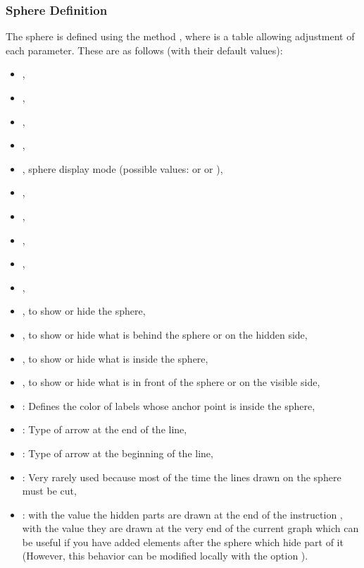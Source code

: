 \subsubsection{Sphere Definition}

The sphere is defined using the method , where  is a table allowing adjustment of each parameter. These are as follows (with their default values):
\begin{itemize}
    \item {},
    \item {},
    \item {},
    \item {},
    \item {}, sphere display mode (possible values:  or  or ),
    \item {},
    \item {},
    \item {},
    \item {},
    \item {},
    \item {}, to show or hide the sphere,
    \item {}, to show or hide what is behind the sphere or on the hidden side,
    \item {}, to show or hide what is inside the sphere,
    \item {}, to show or hide what is in front of the sphere or on the visible side,    
    \item {}: Defines the color of labels whose anchor point is inside the sphere,
    \item {}: Type of arrow at the end of the line,
    \item {}: Type of arrow at the beginning of the line,
    \item {}: Very rarely used because most of the time the lines drawn on the sphere must be cut,
    \item {}: with the value \false the hidden parts are drawn at the end of the instruction , with the value \true they are drawn at the very end of the current graph which can be useful if you have added elements after the sphere which hide part of it (However, this behavior can be modified locally with the option ).
\end{itemize}


